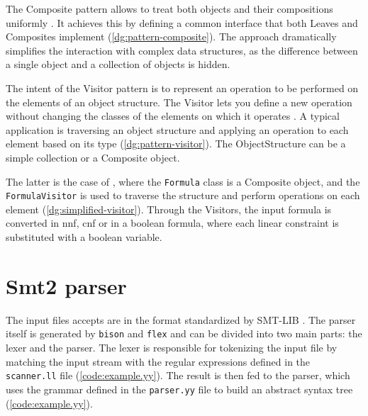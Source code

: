 The Composite pattern allows to treat both objects and their compositions uniformly \cite{book:gof}.
It achieves this by defining a common interface that both Leaves and Composites implement (\autoref{dg:pattern-composite}).
The approach dramatically simplifies the interaction with complex data structures, as the difference between a single object and a collection of objects is hidden.


The intent of the Visitor pattern is to represent an operation to be performed on the elements of an object structure.
The Visitor lets you define a new operation without changing the classes of the elements on which it operates \cite{book:gof}.
A typical application is traversing an object structure and applying an operation to each element based on its type (\autoref{dg:pattern-visitor}).
The ObjectStructure can be a simple collection or a Composite object.


The latter is the case of \dlinear, where the \texttt{Formula} class is a Composite object, and the \texttt{FormulaVisitor} is used to traverse the structure and perform operations on each element (\autoref{dg:simplified-visitor}).
Through the Visitors, the input formula is converted in \gls{nnf}, \gls{cnf} or in a boolean formula, where each linear constraint is substituted with a boolean variable.


\section{Smt2 parser}

The input files \dlinear accepts are in the format standardized by SMT-LIB \cite{docs:smtlib}.
The parser itself is generated by \texttt{bison} and \texttt{flex} and can be divided into two main parts: the lexer and the parser.
The lexer is responsible for tokenizing the input file by matching the input stream with the regular expressions defined in the \texttt{scanner.ll} file (\autoref{code:example.yy}).
The result is then fed to the parser, which uses the grammar defined in the \texttt{parser.yy} file to build an abstract syntax tree (\autoref{code:example.yy}).

